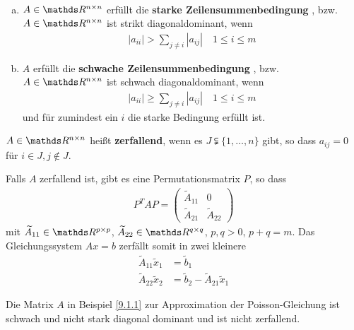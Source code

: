 \begin{Defe}~
  \begin{enumerate}[a)]
  \item $A\in\R^{n\times n}$ erfüllt die \textbf{starke Zeilensummenbedingung}
    , 
    bzw. $A\in\R^{n\times n}$ ist strikt diagonaldominant, wenn
    \begin{gather}
      |a_{ii}|>\sum_{j\neq i} |a_{ij}| \quad 1\leq i\leq m
      \label{IX.3.7}
    \end{gather}
  \item $A$ erfüllt die \textbf{schwache Zeilensummenbedingung}
    , 
    bzw. $A\in\R^{n\times n}$ ist schwach diagonaldominant, wenn
    \begin{gather}
      |a_{ii}|\geq \sum_{j\neq i} |a_{ij}| \quad 1\leq i\leq m
      \label{IX.3.8}
    \end{gather} 
    und für zumindest ein $i$ die starke Bedingung erfüllt ist.
  \end{enumerate}
\end{Defe}

\begin{Defe}
  $A\in\R^{n\times n}$ heißt \textbf{zerfallend},
  wenn es $J\subsetneqq \{1,\ldots,n\}$ gibt,
  so dass $a_{ij}=0$ für $i\in J, j\not\in J$.
\end{Defe}

\begin{Beme}
  Falls $A$ zerfallend ist, gibt es eine Permutationsmatrix $P$, 
  so dass
  \begin{gather*}
    P^TAP = \begin{pmatrix}
      \widetilde{A}_{11}&0\\
      \widetilde{A}_{21}&\widetilde{A}_{22}
    \end{pmatrix}
  \end{gather*}
mit $\widetilde{A}_{11}\in\R^{p\times p}$,
$\widetilde{A}_{22}\in\R^{q\times q}$,
$p,q>0$, $p+q=m$.
Das Gleichungssystem $Ax=b$ zerfällt somit in zwei kleinere
\begin{align*}
  \widetilde{A}_{11}\widetilde{x}_1 &= \widetilde{b}_1\\
  \widetilde{A}_{22}\widetilde{x}_2 &= \widetilde{b}_2
                                      -\widetilde{A}_{21}\widetilde{x}_1
\end{align*}
\end{Beme}

\begin{Bspe}
  Die Matrix $A$ in Beispiel \ref{9.1.1} zur Approximation der
  Poisson-Gleichung ist schwach und nicht stark diagonal dominant und
  ist nicht zerfallend.
\end{Bspe}

